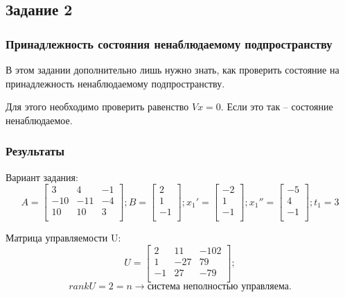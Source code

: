 \subsection{Задание 2}
\subsubsection{Принадлежность состояния ненаблюдаемому подпространству}
В этом задании дополнительно лишь нужно знать, как проверить состояние на принадлежность ненаблюдаемому подпространству.

Для этого необходимо проверить равенство \(Vx = 0\). Если это так -- состояние ненаблюдаемое.


\subsubsection{Результаты}
Вариант задания:
\[ A = \begin{bmatrix}
        3 & 4 & -1 \\
        -10 & -11 & -4 \\
        10 & 10 & 3 \\
        \end{bmatrix}; 
        B = \begin{bmatrix}
                2 \\
                1 \\
                -1 \\
                \end{bmatrix}; 
        x_1' = \begin{bmatrix}
                -2 \\
                1 \\
                -1 \\
                \end{bmatrix}; 
        x_1'' = \begin{bmatrix}
                -5 \\
                4 \\
                -1 \\
                \end{bmatrix}; 
        t_1 = 3
\]

Матрица управляемости U:
\[ U = \begin{bmatrix}
        2 & 11 & -102 \\
        1 & -27 & 79 \\
        -1 & 27 & -79 \\
        \end{bmatrix};
\]
\[rankU = 2 = n \rightarrow \text{система  неполностью управляема.}\]


